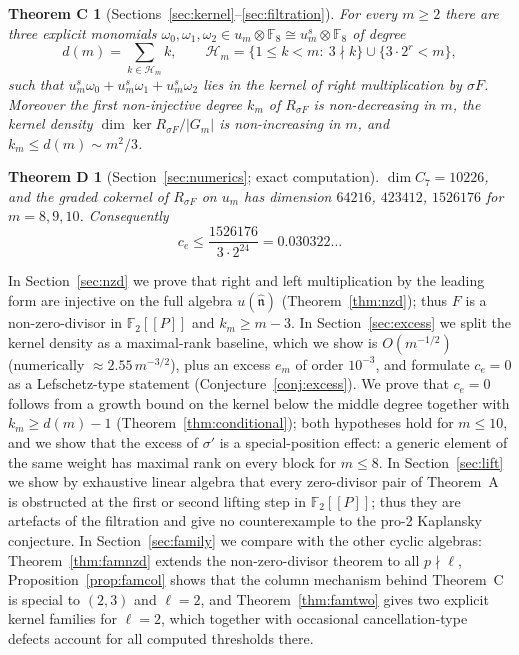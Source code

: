 \documentclass[11pt]{amsart}
\newtheorem*{theoremC}{Theorem C}
\newtheorem*{theoremD}{Theorem D}
\theoremstyle{definition}
\newcommand{\F}{\mathbb{F}}
\newcommand{\hatn}{\widehat{\mathfrak n}}
\newcommand{\Hcal}{\mathcal H}
\begin{document}
\begin{theoremC}[Sections~\ref{sec:kernel}--\ref{sec:filtration}]
For every $m\ge2$ there are three explicit monomials $\omega_0,\omega_1,\omega_2\in u_m\otimes\F_8\cong u^s_m\otimes\F_8$ of degree
\[
  d(m)=\sum_{k\in\Hcal_m}k,\qquad \Hcal_m=\{1\le k<m:\ 3\nmid k\}\cup\{3\cdot 2^r<m\},
\]
such that $u^s_m\omega_0+u^s_m\omega_1+u^s_m\omega_2$ lies in the kernel of right multiplication by $\sigma F$.
Moreover the first non-injective degree $k_m$ of $R_{\sigma F}$ is non-decreasing in $m$, the kernel density
$\dim\ker R_{\sigma F}/|G_m|$ is non-increasing in $m$, and $k_m\le d(m)\sim m^2/3$.
\end{theoremC}

\begin{theoremD}[Section~\ref{sec:numerics}; exact computation]
$\dim C_7=10226$, and the graded cokernel of $R_{\sigma F}$ on $u_m$ has dimension $64216$, $423412$, $1526176$
for $m=8,9,10$. Consequently
\[
  c_e\le \frac{1526176}{3\cdot 2^{24}}=0.030322\ldots
\]
\end{theoremD}

In Section~\ref{sec:nzd} we prove that right and left multiplication by the leading form are injective on the full
algebra $u(\hatn)$ (Theorem~\ref{thm:nzd}); thus $F$ is a non-zero-divisor in $\F_2[[P]]$ and $k_m\ge m-3$.
In Section~\ref{sec:excess} we split the kernel density as a maximal-rank baseline, which we show is
$O(m^{-1/2})$ (numerically $\approx2.55\,m^{-3/2}$), plus an excess $e_m$ of order $10^{-3}$, and formulate
$c_e=0$ as a Lefschetz-type statement (Conjecture~\ref{conj:excess}). We prove that $c_e=0$ follows from a growth bound
on the kernel below the middle degree together with $k_m\ge d(m)-1$ (Theorem~\ref{thm:conditional}); both hypotheses hold
for $m\le10$, and we show that the excess of $\sigma'$ is a special-position effect: a generic element of the same
weight has maximal rank on every block for $m\le8$. In Section~\ref{sec:lift} we show by exhaustive
linear algebra that every zero-divisor pair of Theorem~A is obstructed at the first or second lifting step in
$\F_2[[P]]$; thus they are artefacts of the filtration and give no counterexample to the pro-2 Kaplansky conjecture.
In Section~\ref{sec:family} we compare with the other cyclic algebras: Theorem~\ref{thm:famnzd} extends the
non-zero-divisor theorem to all $p\nmid\ell$, Proposition~\ref{prop:famcol} shows that the column mechanism behind
Theorem~C is special to $(2,3)$ and $\ell=2$, and Theorem~\ref{thm:famtwo} gives two explicit kernel families for
$\ell=2$, which together with occasional cancellation-type defects account for all computed thresholds there.
\end{document}
